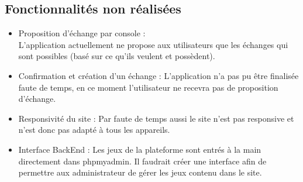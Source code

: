 \documentclass[a4paper,12pt,abstracton,titlepage]{scrartcl}
\begin{document}
\subsection{Fonctionnalités non réalisées}
\begin{itemize}
\item Proposition d'échange par console :\\
L'application actuellement ne propose aux utilisateurs que les échanges qui sont possibles (basé sur ce qu'ils veulent et possèdent).
\item Confirmation et création d'un échange : L'application n'a pas pu être finalisée faute de temps, en ce moment l'utilisateur ne recevra pas de proposition d'échange.
\item Responsivité du site : Par faute de temps aussi le site n'est pas responsive et n'est donc pas adapté à tous les appareils.
\item Interface BackEnd : Les jeux de la plateforme sont entrés à la main directement dans phpmyadmin. Il faudrait créer une interface afin de permettre aux administrateur de gérer les jeux contenu dans le site.
\end{itemize}

 










\end{document}
